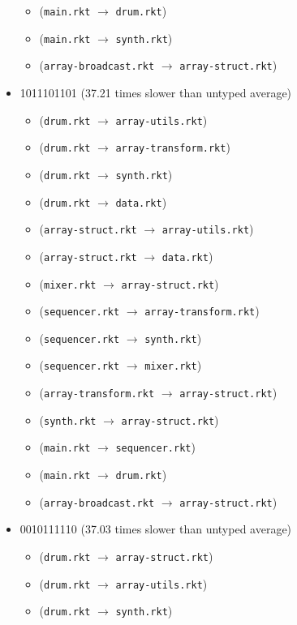 \documentclass{article}
\newcommand{\mono}[1]{\texttt{#1}}
\begin{document}
\begin{itemize}
\begin{itemize}
  \item (\mono{main.rkt} $\rightarrow$ \mono{drum.rkt})
  \item (\mono{main.rkt} $\rightarrow$ \mono{synth.rkt})
  \item (\mono{array-broadcast.rkt} $\rightarrow$ \mono{array-struct.rkt})
  \end{itemize}
\item 1011101101 (37.21 times slower than untyped average)
  \begin{itemize}
  \item (\mono{drum.rkt} $\rightarrow$ \mono{array-utils.rkt})
  \item (\mono{drum.rkt} $\rightarrow$ \mono{array-transform.rkt})
  \item (\mono{drum.rkt} $\rightarrow$ \mono{synth.rkt})
  \item (\mono{drum.rkt} $\rightarrow$ \mono{data.rkt})
  \item (\mono{array-struct.rkt} $\rightarrow$ \mono{array-utils.rkt})
  \item (\mono{array-struct.rkt} $\rightarrow$ \mono{data.rkt})
  \item (\mono{mixer.rkt} $\rightarrow$ \mono{array-struct.rkt})
  \item (\mono{sequencer.rkt} $\rightarrow$ \mono{array-transform.rkt})
  \item (\mono{sequencer.rkt} $\rightarrow$ \mono{synth.rkt})
  \item (\mono{sequencer.rkt} $\rightarrow$ \mono{mixer.rkt})
  \item (\mono{array-transform.rkt} $\rightarrow$ \mono{array-struct.rkt})
  \item (\mono{synth.rkt} $\rightarrow$ \mono{array-struct.rkt})
  \item (\mono{main.rkt} $\rightarrow$ \mono{sequencer.rkt})
  \item (\mono{main.rkt} $\rightarrow$ \mono{drum.rkt})
  \item (\mono{array-broadcast.rkt} $\rightarrow$ \mono{array-struct.rkt})
  \end{itemize}
\item 0010111110 (37.03 times slower than untyped average)
  \begin{itemize}
  \item (\mono{drum.rkt} $\rightarrow$ \mono{array-struct.rkt})
  \item (\mono{drum.rkt} $\rightarrow$ \mono{array-utils.rkt})
  \item (\mono{drum.rkt} $\rightarrow$ \mono{synth.rkt})

\end{itemize}
\end{itemize}
\end{document}
